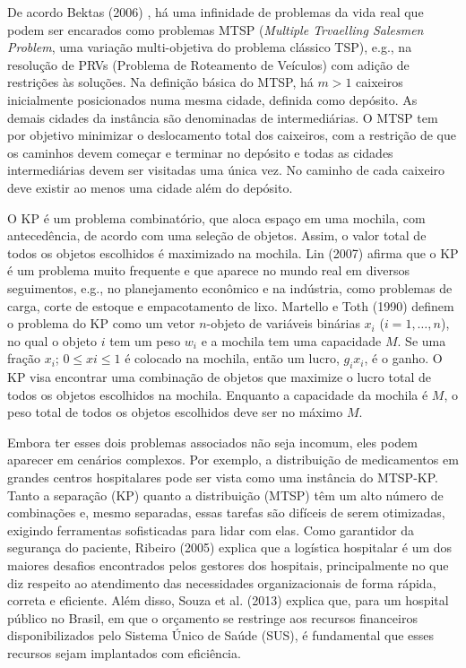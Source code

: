 De acordo Bektas (2006) \cite{bektas2006multiple}, há uma infinidade de problemas da vida real que podem ser encarados como problemas MTSP (\textit{Multiple Trvaelling Salesmen Problem}, uma variação multi-objetiva do problema clássico TSP), e.g., na resolução de PRVs (Problema de Roteamento de Veículos) com adição de restrições às soluções. Na definição básica do MTSP, há $m > 1$ caixeiros inicialmente posicionados numa mesma cidade, definida como depósito. As demais cidades da instância são denominadas de intermediárias. O MTSP tem por objetivo minimizar o deslocamento total dos caixeiros, com a restrição de que os caminhos devem começar e terminar no depósito e todas as cidades intermediárias devem ser visitadas uma única vez. No caminho de cada caixeiro deve existir ao menos uma cidade além do depósito.

O KP é um problema combinatório, que aloca espaço em uma mochila, com antecedência, de acordo com uma seleção de objetos. Assim, o valor total de todos os objetos escolhidos é maximizado na mochila. Lin (2007) \cite{lin2008solving} afirma que o KP é um problema muito frequente e que aparece no mundo real em diversos seguimentos, e.g., no planejamento econômico e na indústria, como problemas de carga, corte de estoque e empacotamento de lixo. Martello e Toth (1990) \cite{Martello:1990:KPA:98124} definem o problema do KP como um vetor $n$-objeto de variáveis binárias $x_i$ ($i = 1,…, n$), no qual o objeto $i$ tem um peso $w_i$ e a mochila tem uma capacidade $M$. Se uma fração $x_i$; $0 \leq xi \leq 1$ é colocado na mochila, então um lucro, $g_i x_i$, é o ganho. O KP visa encontrar uma combinação de objetos que maximize o lucro total de todos os objetos escolhidos na mochila. Enquanto a capacidade da mochila é $M$, o peso total de todos os objetos escolhidos deve ser no máximo $M$.

Embora ter esses dois problemas associados não seja incomum, eles podem aparecer em cenários complexos. Por exemplo, a distribuição de medicamentos em grandes centros hospitalares pode ser vista como uma instância do MTSP-KP. Tanto a separação (KP) quanto a distribuição (MTSP) têm um alto número de combinações e, mesmo separadas, essas tarefas são difíceis de serem otimizadas, exigindo ferramentas sofisticadas para lidar com elas. Como garantidor da segurança do paciente, Ribeiro (2005) \cite{ribeiro_2005} explica que a logística hospitalar é um dos maiores desafios encontrados pelos gestores dos hospitais, principalmente no que diz respeito ao atendimento das necessidades organizacionais de forma rápida, correta e eficiente. Além disso, Souza et al. (2013) \cite{de2013logistica} explica que, para um hospital público no Brasil, em que o orçamento se restringe aos recursos financeiros disponibilizados pelo Sistema Único de Saúde (SUS), é fundamental que esses recursos sejam implantados com eficiência.

